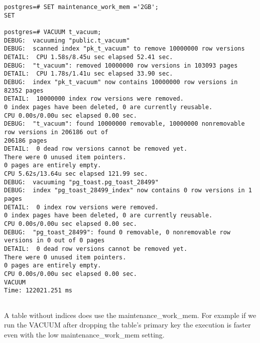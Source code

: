 \begin{lstlisting}[style=pgsql]
postgres=# SET maintenance_work_mem ='2GB';
SET

postgres=# VACUUM t_vacuum;
DEBUG:  vacuuming "public.t_vacuum"
DEBUG:  scanned index "pk_t_vacuum" to remove 10000000 row versions
DETAIL:  CPU 1.58s/8.45u sec elapsed 52.41 sec.
DEBUG:  "t_vacuum": removed 10000000 row versions in 103093 pages
DETAIL:  CPU 1.78s/1.41u sec elapsed 33.90 sec.
DEBUG:  index "pk_t_vacuum" now contains 10000000 row versions in 82352 pages
DETAIL:  10000000 index row versions were removed.
0 index pages have been deleted, 0 are currently reusable.
CPU 0.00s/0.00u sec elapsed 0.00 sec.
DEBUG:  "t_vacuum": found 10000000 removable, 10000000 nonremovable row versions in 206186 out of 
206186 pages
DETAIL:  0 dead row versions cannot be removed yet.
There were 0 unused item pointers.
0 pages are entirely empty.
CPU 5.62s/13.64u sec elapsed 121.99 sec.
DEBUG:  vacuuming "pg_toast.pg_toast_28499"
DEBUG:  index "pg_toast_28499_index" now contains 0 row versions in 1 pages
DETAIL:  0 index row versions were removed.
0 index pages have been deleted, 0 are currently reusable.
CPU 0.00s/0.00u sec elapsed 0.00 sec.
DEBUG:  "pg_toast_28499": found 0 removable, 0 nonremovable row versions in 0 out of 0 pages
DETAIL:  0 dead row versions cannot be removed yet.
There were 0 unused item pointers.
0 pages are entirely empty.
CPU 0.00s/0.00u sec elapsed 0.00 sec.
VACUUM
Time: 122021.251 ms


\end{lstlisting}

A table without indices does use the maintenance\_work\_mem. For example if we run 
the VACUUM after dropping the table's primary key the execution is faster even with the low 
maintenance\_work\_mem setting.\newline

